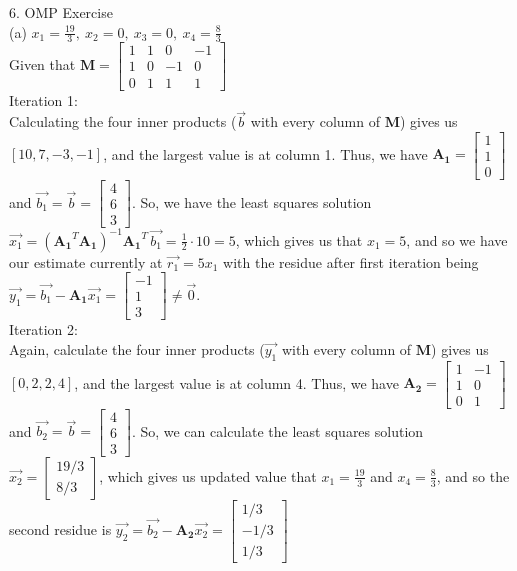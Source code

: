 \documentclass{article}
\begin{document}
{\Large 6. OMP Exercise} \\[.5cm]
{\large {\color{red} (a) $x_1 = \frac{19}{3},\
 x_2 = 0,\
 x_3 = 0,\
 x_4 = \frac{8}{3}$ }} \\[.3cm]

Given that $\mathbf{M} = \begin{bmatrix}
	1 & 1 & 0 & -1 \\
	1 & 0 & -1 & 0 \\
	0 & 1 & 1 & 1
\end{bmatrix}$ \\[.3cm]

Iteration 1: \\

Calculating the four inner products ($\vec{b}$ with every column of $\mathbf{M}$) gives us $[10, 7, -3, -1]$, and the largest value is at column 1. Thus, we have
$\mathbf{A_1} = \begin{bmatrix}
    1 \\
 	1 \\
 	0
\end{bmatrix}$ and
$\vec{b_1} = \vec{b} = \begin{bmatrix}
	4 \\
	6 \\
 	3
\end{bmatrix}$.
So, we have the least squares solution
$\vec{x_1} =
(\mathbf{A_1}^T\mathbf{A_1})^{-1}\mathbf{A_1}^T\,\vec{b_1} =
\frac{1}{2}\cdot10 = 5$,
which gives us that $x_1 = 5$, and so we have our estimate currently at $\vec{r_1} = 5x_1$ with the residue after first iteration being
$\vec{y_1} =
\vec{b_1} - \mathbf{A_1}\vec{x_1} = \begin{bmatrix}
	-1 \\
	1 \\
	3
\end{bmatrix} \neq \vec{0}$. \\[.3cm]

Iteration 2: \\

Again, calculate the four inner products ($\vec{y_1}$ with every column of $\mathbf{M}$) gives us $[0, 2, 2, 4]$, and the largest value is at column 4. Thus, we have
$\mathbf{A_2} = \begin{bmatrix}
	1 & -1 \\
	1 & 0 \\
	0 & 1
\end{bmatrix}$ and
$\vec{b_2} = \vec{b} = \begin{bmatrix}
	4 \\
	6 \\
 	3
\end{bmatrix}$.
So, we can calculate the least squares solution
$\vec{x_2} = \begin{bmatrix}
	19/3 \\
	8/3
\end{bmatrix}$,
which gives us updated value that $x_1 = \frac{19}{3}$ and $x_4 = \frac{8}{3}$, and so the second residue is
$\vec{y_2} =
\vec{b_2} - \mathbf{A_2}\vec{x_2} = \begin{bmatrix}
	1/3 \\
	-1/3 \\
	1/3
\end{bmatrix}$ \\[.3cm]
\end{document}
